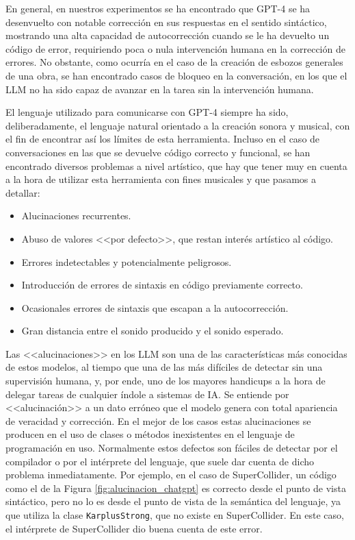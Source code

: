 En general, en nuestros experimentos se ha encontrado que GPT-4 se ha desenvuelto con notable corrección en sus respuestas en el sentido sintáctico, mostrando una alta capacidad de autocorrección cuando se le ha devuelto un código de error, requiriendo poca o nula intervención humana en la corrección de errores. No obstante, como ocurría en el caso de la creación de esbozos generales de una obra, se han encontrado casos de bloqueo en la conversación, en los que el LLM no ha sido capaz de avanzar en la tarea sin la intervención humana. 

El lenguaje utilizado para comunicarse con GPT-4 siempre ha sido, deliberadamente, el lenguaje natural orientado a la creación sonora y musical, con el fin de encontrar así los límites de esta herramienta. Incluso en el caso de conversaciones en las que se devuelve código correcto y funcional, se han encontrado diversos problemas a nivel artístico, que hay que tener muy en cuenta a la hora de utilizar esta herramienta con fines musicales y que pasamos a detallar:

\begin{itemize}
    \item Alucinaciones recurrentes.
    \item Abuso de valores <<por defecto>>, que restan interés artístico al código.
    \item Errores indetectables y potencialmente peligrosos.
    \item Introducción de errores de sintaxis en código previamente correcto.
    \item Ocasionales errores de sintaxis que escapan a la autocorrección.
    \item Gran distancia entre el sonido producido y el sonido esperado.
\end{itemize}

Las <<alucinaciones>> en los LLM son una de las características más conocidas de estos modelos, al tiempo que una de las más difíciles de detectar sin una supervisión humana, y, por ende, uno de los mayores handicups a la hora de delegar tareas de cualquier índole a sistemas de IA. Se entiende por <<alucinación>> a un dato erróneo que el modelo genera con total apariencia de veracidad y corrección. En el mejor de los casos estas alucinaciones se producen en el uso de clases o métodos inexistentes en el lenguaje de programación en uso. Normalmente estos defectos son fáciles de detectar por el compilador o por el intérprete del lenguaje, que suele dar cuenta de dicho problema inmediatamente. Por ejemplo, en el caso de SuperCollider, un código como el de la Figura \ref{fig:alucinacion_chatgpt} es correcto desde el punto de vista sintáctico, pero no lo es desde el punto de vista de la semántica del lenguaje, ya que utiliza la clase \texttt{KarplusStrong}, que no existe en SuperCollider. En este caso, el intérprete de SuperCollider dio buena cuenta de este error. 

